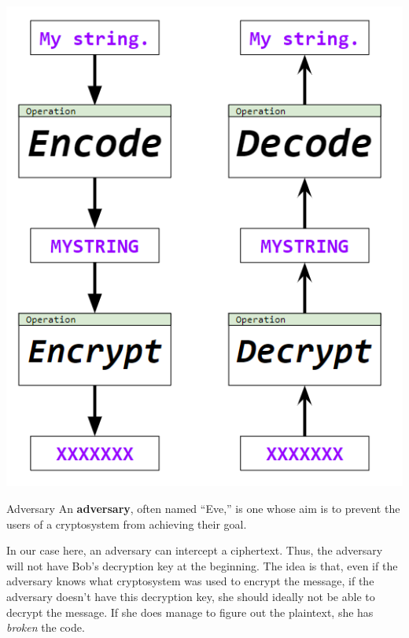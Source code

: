 \documentclass[letterpaper]{article}
\begin{document}
\begin{center}
    \includegraphics[scale=0.8]{../assets/encode_encrypt.png}
\end{center}

\begin{definition}{Adversary}{}
    An \textbf{adversary}, often named ``Eve,'' is one whose aim is to prevent the users of a cryptosystem from achieving their goal. 
\end{definition}
In our case here, an adversary can intercept a ciphertext. Thus, the adversary will not have Bob's decryption key at the beginning. The idea is that, even if the adversary knows what cryptosystem was used to encrypt the message, if the adversary doesn't have this decryption key, she should ideally not be able to decrypt the message. If she does manage to figure out the plaintext, she has \emph{broken} the code.
\end{document}
